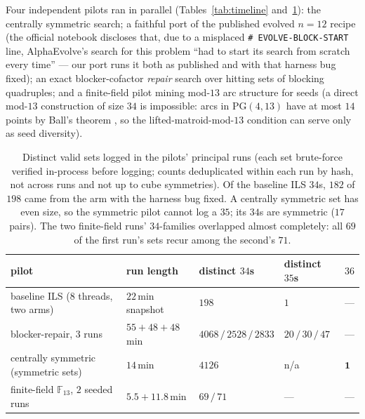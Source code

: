 \documentclass[10pt]{article}
\theoremstyle{remark}
\begin{document}
Four independent pilots ran in parallel
(Tables~\ref{tab:timeline} and~\ref{tab:abundance}): the
centrally symmetric search; a faithful port of the published evolved
$n = 12$ recipe (the official notebook discloses that, due to a misplaced
\texttt{\#\,EVOLVE-BLOCK-START} line, AlphaEvolve's search for this problem
``had to start its search from scratch every time'' \cite{Repo} --- our port
runs it both as published and with that harness bug fixed); an exact
blocker-cofactor \emph{repair} search over hitting sets of blocking
quadruples; and a finite-field pilot mining mod-$13$ arc structure for
seeds (a direct mod-$13$ construction of size $34$ is impossible: arcs in
$\mathrm{PG}(4,13)$ have at most $14$ points by Ball's theorem
\cite{Ball2012}, so the lifted-matroid-mod-$13$ condition can serve only as
seed diversity).

\begin{table}[ht]
\centering\footnotesize
\begin{tabular}{@{}lllll@{}}
\toprule
pilot & run length & distinct $34$s & distinct $35$s & $36$ \\
\midrule
baseline ILS ($8$ threads, two arms) & $22$\,min snapshot & $198$ & $1$ & --- \\
blocker-repair, $3$ runs & $55 + 48 + 48$\,min & $4068\,/\,2528\,/\,2833$ & $20\,/\,30\,/\,47$ & --- \\
centrally symmetric (symmetric sets) & $14$\,min & $4126$ & n/a & $\mathbf{1}$ \\
finite-field $\mathbb{F}_{13}$, $2$ seeded runs & $5.5 + 11.8$\,min & $69\,/\,71$ & --- & --- \\
\bottomrule
\end{tabular}
\caption{Distinct valid sets logged in the pilots' principal runs (each set
brute-force verified in-process before logging; counts deduplicated within
each run by hash, not across runs and not up to cube symmetries). Of the
baseline ILS $34$s, $182$ of $198$ came from the arm with the harness bug
fixed. A centrally symmetric set has even size, so the symmetric pilot
cannot log a $35$; its $34$s are symmetric ($17$ pairs). The two
finite-field runs' $34$-families overlapped almost completely: all $69$ of
the first run's sets recur among the second's $71$.}
\label{tab:abundance}
\end{table}
\end{document}

